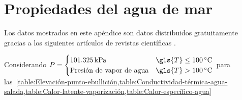 %
%
%

\chapter{Propiedades del agua de mar}\label{ch:seawater-properties}

Los datos mostrados en este apéndice son datos distribuidos gratuitamente  gracias a los siguientes artículos de revistas científicas \cites{nayar_thermophysical_2016}{sharqawy_thermophysical_2010}.

	Considerando \(
		P = \begin{cases}
			\qty{101.325}{\kilo\pascal} & \gls{T} \leq \qty{100}{\degreeCelsius} \\
			\text{Presión de vapor de agua} & \gls{T} > \qty{100}{\degreeCelsius} \\
		\end{cases}
	\) para las~\cref{table:Elevación-punto-ebullición,table:Conductividad-térmica-agua-salada,table:Calor-latente-vaporización,table:Calor-específico-agua}


